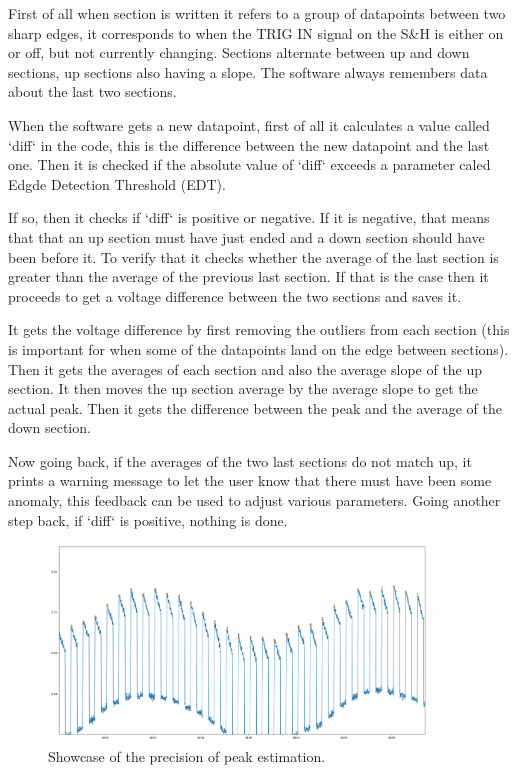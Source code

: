 \documentclass[a4paper, 10pt]{article}
\begin{document}
First of all when section is written it refers to a group of datapoints between two sharp edges, it corresponds to when the TRIG IN signal on the S\&H is either on or off, but not currently changing.
Sections alternate between up and down sections, up sections also having a slope.
The software always remembers data about the last two sections.

When the software gets a new datapoint, first of all it calculates a value called `diff` in the code, this is the difference between the new datapoint and the last one.
Then it is checked if the absolute value of `diff` exceeds a parameter caled Edgde Detection Threshold (EDT).

If so, then it checks if `diff` is positive or negative.
If it is negative, that means that that an up section must have just ended and a down section should have been before it.
To verify that it checks whether the average of the last section is greater than the average of the previous last section.
If that is the case then it proceeds to get a voltage difference between the two sections and saves it.

It gets the voltage difference by first removing the outliers from each section (this is important for when some of the datapoints land on the edge between sections).
Then it gets the averages of each section and also the average slope of the up section.
It then moves the up section average by the average slope to get the actual peak.
Then it gets the difference between the peak and the average of the down section.

Now going back, if the averages of the two last sections do not match up, it prints a warning message to let the user know that there must have been some anomaly, this feedback can be used to adjust various parameters.
Going another step back, if `diff` is positive, nothing is done.

\begin{figure}[H]
    \centering
    \includegraphics[width=0.9\textwidth]{../images/soft-spike-est.png}
    \caption{Showcase of the precision of peak estimation.}
    \label{fig:soft-spike-est}
\end{figure}
\end{document}
